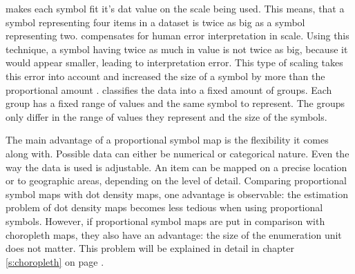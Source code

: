 \begin{enumerate}
 makes each symbol fit it's dat value on the scale being used. This means, that a symbol representing four items in a dataset is twice as big as a symbol representing two.
 compensates for human error interpretation in scale. Using this technique, a symbol having twice as much in value is not twice as big, because it would appear smaller, leading to interpretation error. This type of scaling takes this error into account and increased the size of a symbol by more than the proportional amount .
 classifies the data into a fixed amount of groups. Each group has a fixed range of values and the same symbol to represent. The groups only differ in the range of values they represent and the size of the symbols.
\end{enumerate}

The main advantage of a proportional symbol map is the flexibility it comes along with. Possible data can either be numerical or categorical nature. Even the way the data is used is adjustable. An item can be mapped on a precise location or to geographic areas, depending on the level of detail.
Comparing proportional symbol maps with dot density maps, one advantage is observable: the estimation problem of dot density maps becomes less tedious when using proportional symbols. However, if proportional symbol maps are put in comparison with choropleth maps, they also have an advantage: the size of the enumeration unit does not matter. This problem will be explained in detail in chapter \ref{s:choropleth} on page \pageref{s:choropleth}.